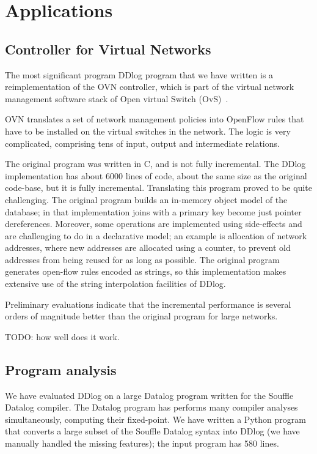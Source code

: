 \section{Applications}\label{sec:applications}

\subsection{Controller for Virtual Networks}

The most significant program DDlog program that we have written is a
reimplementation of the OVN controller, which is part of the virtual
network management software stack of Open virtual Switch
(OvS)~\cite{Pfaff-nsdi15}.

OVN translates a set of network management policies into OpenFlow
rules that have to be installed on the virtual switches in the
network.  The logic is very complicated, comprising tens of input,
output and intermediate relations.

The original program was written in C, and is not fully incremental.
The DDlog implementation has about 6000 lines of code, about the same
size as the original code-base, but it is fully incremental.
Translating this program proved to be quite challenging.  The original
program builds an in-memory object model of the database; in that
implementation joins with a primary key become just pointer
dereferences.  Moreover, some operations are implemented using
side-effects and are challenging to do in a declarative model; an
example is allocation of network addresses, where new addresses are
allocated using a counter, to prevent old addresses from being reused
for as long as possible.  The original program generates open-flow
rules encoded as strings, so this implementation makes extensive use
of the string interpolation facilities of DDlog.

Preliminary evaluations indicate that the incremental performance is
several orders of magnitude better than the original program for large
networks.

TODO: how well does it work.

\subsection{Program analysis}

We have evaluated DDlog on a large Datalog program written for the
Souffle Datalog compiler.  The Datalog program has performs many
compiler analyses simultaneously, computing their fixed-point.  We
have written a Python program that converts a large subset of the
Souffle Datalog syntax into DDlog (we have manually handled the
missing features); the input program has 580 lines.

